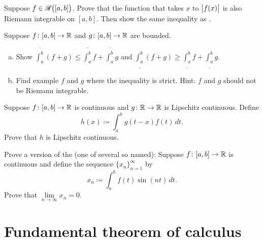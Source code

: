 \begin{exercise}[Challenging] \label{exercise:hardabsint}
Suppose $f \in {\mathscr{R}}\bigl([a,b]\bigr)$.  Prove that the function that takes $x$ to
$\bigl\lvert {f(x)} \bigr\rvert$ is also Riemann integrable on $[a,b]$.
Then show the same inequality as .
\end{exercise}

\begin{exercise}  \label{exercise:upperlowerlinineq}
Suppose $f \colon [a,b] \to {\mathbb{R}}$ and $g \colon [a,b] \to {\mathbb{R}}$
are bounded.
\begin{enumerate}[a)]
\item
Show
$\overline{\int_a^b} (f+g) \leq \overline{\int_a^b}f+\overline{\int_a^b}g$ and
$\underline{\int_a^b} (f+g) \geq
\underline{\int_a^b}f+\underline{\int_a^b}g$.
\item
Find example $f$ and $g$ where
the inequality is strict.  Hint: $f$ and $g$ should not be Riemann
integrable.
\end{enumerate}
\end{exercise}

\begin{exercise}
Suppose $f \colon [a,b] \to {\mathbb{R}}$ is continuous and $g \colon {\mathbb{R}} \to {\mathbb{R}}$ is
Lipschitz continuous.  Define
\begin{equation*}
h(x) \coloneqq \int_a^b g(t-x) f(t) \, dt .
\end{equation*}
Prove that $h$ is Lipschitz continuous.
\end{exercise}

\begin{exercise} \label{exercise:rieleblem}
Prove a version of the \emph{}
(one of several so named):
Suppose $f \colon [a,b] \to {\mathbb{R}}$ is continuous and define the sequence
$\{ x_n \}_{n=1}^\infty$ by
\begin{equation*}
x_n \coloneqq \int_a^b f(t) \sin(nt) \, dt .
\end{equation*}
Prove that $\lim\limits_{n\to\infty} x_n = 0$.
\end{exercise}


\sectionnewpage
\section{Fundamental theorem of calculus}
\label{sec:ftc}


